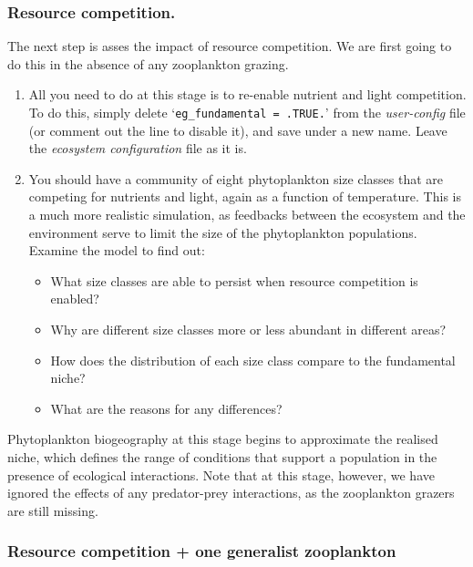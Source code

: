 \documentclass[11pt,fleqn]{book} %
\begin{document}
\subsubsection*{Resource competition.}

The next step is asses the impact of resource competition. We are first going to do this in the absence of any zooplankton grazing.

\begin{enumerate}[noitemsep]
\vspace{1mm}
\item All you need to do at this stage is to re-enable nutrient and light competition. To do this, simply delete `\texttt{eg\_fundamental~=~.TRUE.}' from the \textit{user-config} file (or comment out the line to disable it), and save under a new name. Leave the \textit{ecosystem configuration} file as it is.

\vspace{1mm}
\item You should have a community of eight phytoplankton size classes that are competing for nutrients and light, again as a function of temperature. This is a much more realistic simulation, as feedbacks between the ecosystem and the environment serve to limit the size of the phytoplankton populations. Examine the model to find out:
\vspace{1mm}
\begin{itemize}
\item What size classes are able to persist when resource competition is enabled?
\item Why are different size classes more or less abundant in different areas?
\item How does the distribution of each size class compare to the fundamental niche?
\item What are the reasons for any differences?
\end{itemize}
\end{enumerate}
\vspace{1mm}

Phytoplankton biogeography at this stage begins to approximate the realised niche, which defines the range of conditions that support a population in the presence of ecological interactions. Note that at this stage, however, we have ignored the effects of any predator-prey interactions, as the zooplankton grazers are still missing.


\subsubsection*{Resource competition + one generalist zooplankton}
\end{document}
